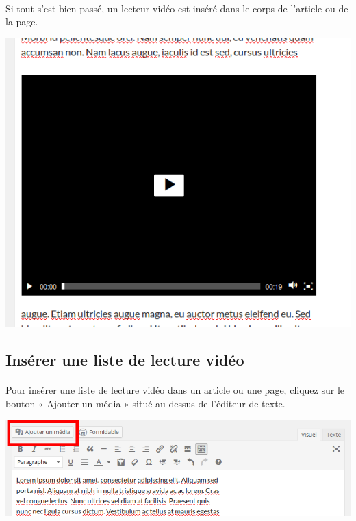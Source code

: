 \documentclass[10pt,a4paper]{article}
\begin{document}
\paragraph{}Si tout s'est bien passé, un lecteur vidéo est inséré dans le corps de l'article ou de la page.
\begin{center}
\includegraphics[scale=0.3]{img/0127.png}
\end{center}
\newpage
\subsection{Insérer une liste de lecture vidéo}
\paragraph{}Pour insérer une liste de lecture vidéo dans un article ou une page, cliquez sur le bouton « Ajouter un média » situé au dessus de l'éditeur de texte.
\begin{center}
\includegraphics[scale=0.3]{img/0102.png}
\end{center}
\end{document}
